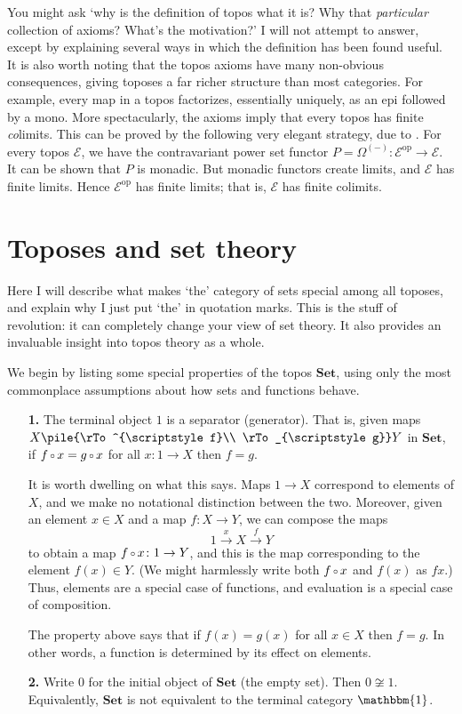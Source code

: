 \documentclass[12pt]{article}
\newcommand{\dashbk}{-}
\newcommand{\cat}[1]{\mathscr{#1}}
\newcommand{\fcat}[1]{\mathbf{#1}}
\newcommand{\op}{\mathrm{op}}
\newcommand{\Set}{\fcat{Set}}
\newcommand{\parpair}[2]{\pile{\rTo^{\scriptstyle #1}\\ 
\rTo_{\scriptstyle #2}}}
\newcommand{\iso}{\cong}
\newcommand{\of}{\,\raisebox{0.08ex}{\ensuremath{\scriptstyle\circ}}\,}
\newcommand{\One}{\mathbbm{1}}
\newcommand{\E}{\cat{E}}
\newcommand{\toby}[1]{\stackrel{#1}{\to}}
\newcommand{\cln}{\colon}
\begin{document}
You might ask `why is the definition of topos what it is?  Why that
\emph{particular} collection of axioms?  What's the motivation?'  I will not
attempt to answer, except by explaining several ways in which the definition
has been found useful.  It is also worth noting that the topos axioms have
many non-obvious consequences, giving toposes a far richer structure than most
categories.  For example, every map in a topos factorizes, essentially
uniquely, as an epi followed by a mono.  More spectacularly, the axioms imply
that every topos has finite \emph{co}limits.  This can be proved by the
following very elegant strategy, due to \citet{Pare}.  For every topos $\E$,
we have the contravariant power set functor $P = \Omega^{(\dashbk)}\cln \E^\op
\to \E$.  It can be shown that $P$ is monadic.  But monadic functors create
limits, and $\E$ has finite limits.  Hence $\E^\op$ has finite limits; that
is, $\E$ has finite colimits.  



\section{Toposes and set theory}
\label{sec:sets}



Here I will describe what makes `the' category of sets special among all
toposes, and explain why I just put `the' in quotation marks.  This is the
stuff of revolution: it can completely change your view of set theory.  It
also provides an invaluable insight into topos theory as a whole.

We begin by listing some special properties of the topos $\Set$, using only
the most commonplace assumptions about how sets and functions behave.

\begin{enumerate}
\item[\textbf{1.}]  
The terminal object $1$ is a separator (generator).  That is, given maps $X
\parpair{f}{g} Y$ in $\Set$, if $f \of x = g \of x$ for all $x\cln 1 \to X$
then $f = g$.

It is worth dwelling on what this says.  Maps $1 \to X$ correspond to elements
of $X$, and we make no notational distinction between the two.  Moreover,
given an element $x \in X$ and a map $f\cln X \to Y$, we can compose the maps
\[
1 \toby{x} X \toby{f} Y
\]
to obtain a map $f \of x\cln 1 \to Y$, and this is the map corresponding to the
element $f(x) \in Y$.  (We might harmlessly write both $f \of x$ and $f(x)$ as
$fx$.)  Thus, elements are a special case of functions, and evaluation is a
special case of composition.

The property above says that if $f(x) = g(x)$ for all $x \in X$ then $f = g$.
In other words, a function is determined by its effect on elements.

\item[\textbf{2.}]
Write $0$ for the initial object of $\Set$ (the empty set).  Then $0 \not\iso
1$.  Equivalently, $\Set$ is not equivalent to the terminal category $\One$.
\end{enumerate}
\end{document}
